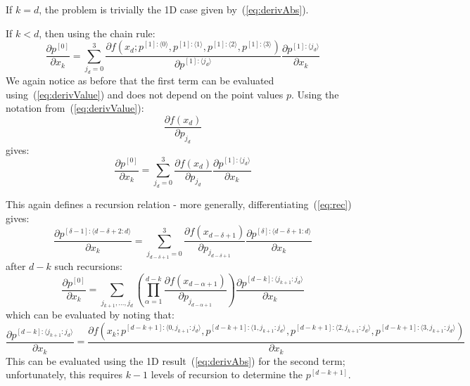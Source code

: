 \documentclass[11pt]{article}
\begin{document}
If $k=d$, the problem is trivially the 1D case given by~(\ref{eq:derivAbs}).

If $k<d$, then using the chain rule:
\begin{equation}
\frac{\partial p^{[0]}}{\partial x_k}
=
\sum_{j_d=0}^3 \frac{\partial f \left ( 
x_d ; 
p^{[1]: \langle 0 \rangle},
p^{[1]: \langle 1 \rangle},
p^{[1]: \langle 2 \rangle},
p^{[1]: \langle 3 \rangle}
\right )
}{
\partial p^{[1]: \langle j_d \rangle}
}
\frac{
\partial p^{[1]: \langle j_d \rangle}
}{
\partial x_k
}
\end{equation}
We again notice as before that the first term can be evaluated using~(\ref{eq:derivValue}) and does not depend on the point values $p$. Using the notation from~(\ref{eq:derivValue}):
\begin{equation}
\frac{ 
\partial f(x_d)
}{
\partial p_{j_d}
}
\end{equation}
gives:
\begin{equation}
\frac{\partial p^{[0]}}{\partial x_k}
=
\sum_{j_d=0}^3 
\frac{\partial f(x_d)}{\partial p_{j_d}}
\frac{
\partial p^{[1]: \langle j_d \rangle}
}{
\partial x_k
}
\end{equation}

This again defines a recursion relation - more generally, differentiating~(\ref{eq:rec}) gives:
\begin{equation}
\frac{\partial p^{[\delta-1]: \langle d-\delta+2:d \rangle}}{\partial x_k} 
= 
\sum_{j_{d-\delta+1} = 0}^3
\frac{\partial f(x_{d-\delta+1})}{\partial p_{j_{d-\delta+1}}}
\frac{\partial p^{[\delta]: \langle d-\delta+1:d \rangle}}{\partial x_k}
\label{eq:recDer}
\end{equation}
after $d-k$ such recursions:
\begin{equation}
\frac{\partial p^{[0]}}{\partial x_k}
=
\sum_{j_{k+1},\dots,j_d}
\left (
\prod_{\alpha=1}^{d-k}
\frac{\partial f(x_{d-\alpha+1})}{\partial p_{j_{d-\alpha+1}}}
\right )
\frac{
\partial p^{[d-k]: \langle j_{k+1} : j_d \rangle}
}{
\partial x_k
}
\label{eq:solnDeriv}
\end{equation}
which can be evaluated by noting that:
\begin{equation}
\frac{
\partial p^{[d-k]: \langle j_{k+1} : j_d \rangle}
}{
\partial x_k
}
=
\frac{
\partial f \left ( 
x_k ; 
p^{[d-k+1]: \langle 0, j_{k+1}:j_d \rangle},
p^{[d-k+1]: \langle 1, j_{k+1}:j_d \rangle},
p^{[d-k+1]: \langle 2, j_{k+1}:j_d \rangle},
p^{[d-k+1]: \langle 3, j_{k+1}:j_d \rangle}
\right )
}{
\partial x_k
}
\label{eq:recDerFinal}
\end{equation}
This can be evaluated using the 1D result~(\ref{eq:derivAbs}) for the second term; unfortunately, this requires $k-1$ levels of recursion to determine the $p^{[d-k+1]}$.
\end{document}
